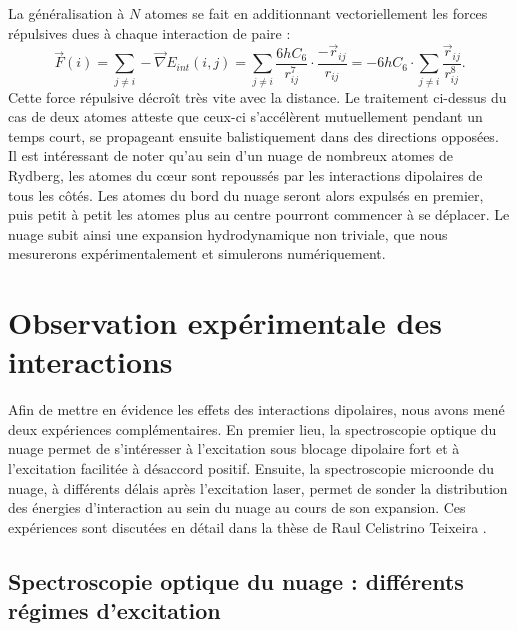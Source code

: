 La généralisation à $N$ atomes se fait en additionnant vectoriellement les forces répulsives dues à chaque interaction de paire :
\begin{equation}
\label{eq:repuls_Natomes}
\vec{F}(i) =  \sum_{j\neq i} -\vec{\nabla}E_{int}(i,j)
= \sum_{j\neq i} \frac{6hC_6}{r_{ij}^7} \cdot \frac{-\vec{r}_{ij}}{r_{ij}}
= - 6hC_6 \cdot \sum_{j\neq i} \frac{\vec{r}_{ij}}{r_{ij}^8}.
\end{equation}
%
Cette force répulsive décroît très vite avec la distance.
Le traitement ci-dessus du cas de deux atomes atteste que
ceux-ci s'accélèrent mutuellement pendant un temps court, se propageant ensuite balistiquement dans des directions opposées.
Il est intéressant de noter qu'au sein d'un nuage de nombreux atomes de Rydberg, les atomes du c\oe ur  sont repoussés par les interactions dipolaires de tous les côtés.
Les atomes du bord du nuage seront alors expulsés en premier, puis petit à petit les atomes plus au centre pourront commencer à se déplacer.
Le nuage subit ainsi une expansion hydrodynamique non triviale, que nous mesurerons expérimentalement et simulerons numériquement.

\clearpage
\section{Observation expérimentale des interactions}
\noindent Afin de mettre en évidence les effets des interactions dipolaires, nous avons mené deux expériences complémentaires.
En premier lieu, la spectroscopie optique du nuage permet de s'intéresser à l'excitation sous blocage dipolaire fort et à l'excitation facilitée à désaccord positif.
Ensuite, la spectroscopie microonde du nuage, à différents délais après l'excitation laser, permet de sonder la distribution des énergies d'interaction au sein du nuage au cours de son expansion.
Ces expériences sont discutées en détail dans la thèse de Raul Celistrino Teixeira \cite{PHD_CELISTRINO}.

	\subsection{Spectroscopie optique du nuage : différents régimes d'excitation}\label{subsec:optical_spectra}
